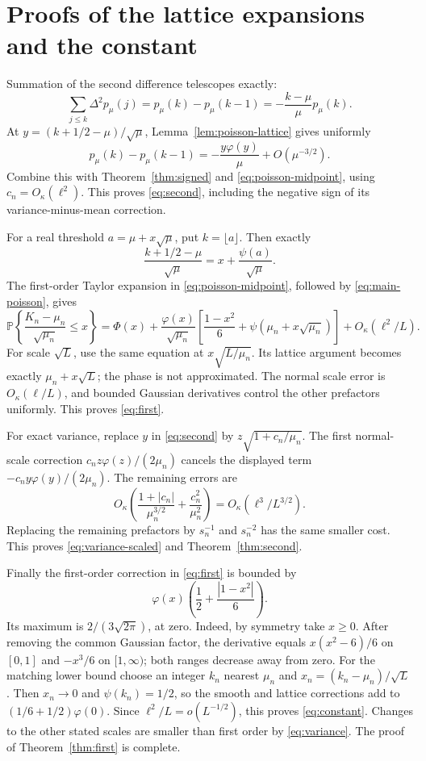 \documentclass[11pt]{article}
\newcommand{\Pp}{\mathbb P}
\theoremstyle{remark}
\begin{document}
\section{Proofs of the lattice expansions and the constant}\label{sec:edgeworth}
Summation of the second difference telescopes exactly:
\begin{equation}\label{eq:telescope-cdf}
 \sum_{j\le k}\Delta^2p_\mu(j)=p_\mu(k)-p_\mu(k-1)
 =-\frac{k-\mu}{\mu}p_\mu(k).
\end{equation}
At $y=(k+1/2-\mu)/\sqrt\mu$, Lemma~\ref{lem:poisson-lattice} gives uniformly
\[
 p_\mu(k)-p_\mu(k-1)=-\frac{y\varphi(y)}\mu+O(\mu^{-3/2}).
\]
Combine this with Theorem~\ref{thm:signed} and \eqref{eq:poisson-midpoint}, using $c_n=O_\kappa(\ell^2)$. This proves \eqref{eq:second}, including the negative sign of its variance-minus-mean correction.

For a real threshold $a=\mu+x\sqrt\mu$, put $k=\lfloor a\rfloor$. Then exactly
\[
 \frac{k+1/2-\mu}{\sqrt\mu}=x+\frac{\psi(a)}{\sqrt\mu}.
\]
The first-order Taylor expansion in \eqref{eq:poisson-midpoint}, followed by \eqref{eq:main-poisson}, gives
\[
 \Pp\left\{\frac{K_n-\mu_n}{\sqrt{\mu_n}}\le x\right\}
 =\Phi(x)+\frac{\varphi(x)}{\sqrt{\mu_n}}
 \left[\frac{1-x^2}{6}+\psi(\mu_n+x\sqrt{\mu_n})\right]
 +O_\kappa(\ell^2/L).
\]
For scale $\sqrt L$, use the same equation at $x\sqrt{L/\mu_n}$. Its lattice argument becomes exactly $\mu_n+x\sqrt L$; the phase is not approximated. The normal scale error is $O_\kappa(\ell/L)$, and bounded Gaussian derivatives control the other prefactors uniformly. This proves \eqref{eq:first}.

For exact variance, replace $y$ in \eqref{eq:second} by $z\sqrt{1+c_n/\mu_n}$. The first normal-scale correction $c_nz\varphi(z)/(2\mu_n)$ cancels the displayed term $-c_ny\varphi(y)/(2\mu_n)$. The remaining errors are
\[
 O_\kappa\left(\frac{1+|c_n|}{\mu_n^{3/2}}+\frac{c_n^2}{\mu_n^2}\right)
 =O_\kappa(\ell^3/L^{3/2}).
\]
Replacing the remaining prefactors by $s_n^{-1}$ and $s_n^{-2}$ has the same smaller cost. This proves \eqref{eq:variance-scaled} and Theorem~\ref{thm:second}.

Finally the first-order correction in \eqref{eq:first} is bounded by
\[
 \varphi(x)\left(\frac12+\frac{|1-x^2|}{6}\right).
\]
Its maximum is $2/(3\sqrt{2\pi})$, at zero. Indeed, by symmetry take $x\ge0$. After removing the common Gaussian factor, the derivative equals $x(x^2-6)/6$ on $[0,1]$ and $-x^3/6$ on $[1,\infty)$; both ranges decrease away from zero. For the matching lower bound choose an integer $k_n$ nearest $\mu_n$ and $x_n=(k_n-\mu_n)/\sqrt L$. Then $x_n\to0$ and $\psi(k_n)=1/2$, so the smooth and lattice corrections add to $(1/6+1/2)\varphi(0)$. Since $\ell^2/L=o(L^{-1/2})$, this proves \eqref{eq:constant}. Changes to the other stated scales are smaller than first order by \eqref{eq:variance}. The proof of Theorem~\ref{thm:first} is complete.
\end{document}
